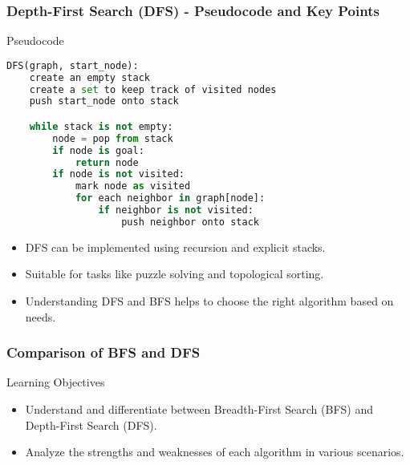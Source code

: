 \documentclass[aspectratio=169]{beamer}
\begin{document}
\begin{frame}[fragile]
    \frametitle{Depth-First Search (DFS) - Pseudocode and Key Points}
    \begin{block}{Pseudocode}
        \begin{lstlisting}[language=Python]
DFS(graph, start_node):
    create an empty stack
    create a set to keep track of visited nodes
    push start_node onto stack

    while stack is not empty:
        node = pop from stack
        if node is goal:
            return node
        if node is not visited:
            mark node as visited
            for each neighbor in graph[node]:
                if neighbor is not visited:
                    push neighbor onto stack
        \end{lstlisting}
    \end{block}
    
    \begin{itemize}
        \item DFS can be implemented using recursion and explicit stacks.
        \item Suitable for tasks like puzzle solving and topological sorting.
        \item Understanding DFS and BFS helps to choose the right algorithm based on needs.
    \end{itemize}
\end{frame}

\begin{frame}
    \frametitle{Comparison of BFS and DFS}
    \begin{block}{Learning Objectives}
        \begin{itemize}
            \item Understand and differentiate between Breadth-First Search (BFS) and Depth-First Search (DFS).
            \item Analyze the strengths and weaknesses of each algorithm in various scenarios.
        \end{itemize}
    \end{block}
\end{frame}
\end{document}
